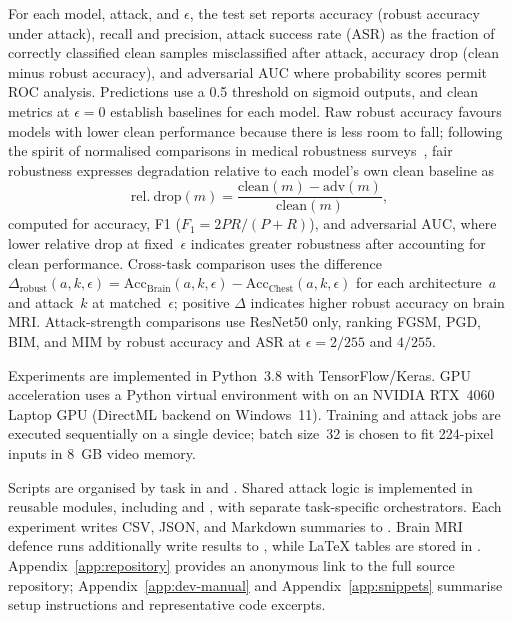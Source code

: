 \documentclass[12pt,a4paper,oneside]{report}
\begin{document}

For each model, attack, and $\epsilon$, the test set reports accuracy (robust accuracy under attack), recall and precision, attack success rate (ASR) as the fraction of correctly classified clean samples misclassified after attack, accuracy drop (clean minus robust accuracy), and adversarial AUC where probability scores permit ROC analysis. Predictions use a 0.5 threshold on sigmoid outputs, and clean metrics at $\epsilon = 0$ establish baselines for each model. Raw robust accuracy favours models with lower clean performance because there is less room to fall; following the spirit of normalised comparisons in medical robustness surveys~\cite{ma2021understanding}, fair robustness expresses degradation relative to each model's own clean baseline as
\[
  \mathrm{rel.\ drop}(m) = \frac{\mathrm{clean}(m) - \mathrm{adv}(m)}{\mathrm{clean}(m)},
\]
computed for accuracy, F1 ($F_1 = 2PR/(P+R)$), and adversarial AUC, where lower relative drop at fixed~$\epsilon$ indicates greater robustness after accounting for clean performance. Cross-task comparison uses the difference $\Delta_{\mathrm{robust}}(a,k,\epsilon) = \mathrm{Acc}_{\mathrm{Brain}}(a,k,\epsilon) - \mathrm{Acc}_{\mathrm{Chest}}(a,k,\epsilon)$ for each architecture~$a$ and attack~$k$ at matched~$\epsilon$; positive $\Delta$ indicates higher robust accuracy on brain MRI. Attack-strength comparisons use ResNet50 only, ranking FGSM, PGD, BIM, and MIM by robust accuracy and ASR at $\epsilon = 2/255$ and $4/255$.

Experiments are implemented in Python~3.8 with TensorFlow/Keras. GPU acceleration uses a Python virtual environment with  on an NVIDIA RTX~4060 Laptop GPU (DirectML backend on Windows~11). Training and attack jobs are executed sequentially on a single device; batch size~32 is chosen to fit 224-pixel inputs in 8~GB video memory.

Scripts are organised by task in  and . Shared attack logic is implemented in reusable modules, including  and , with separate task-specific orchestrators. Each experiment writes CSV, JSON, and Markdown summaries to . Brain MRI defence runs additionally write results to , while LaTeX tables are stored in . Appendix~\ref{app:repository} provides an anonymous link to the full source repository; Appendix~\ref{app:dev-manual} and Appendix~\ref{app:snippets} summarise setup instructions and representative code excerpts.
\end{document}
